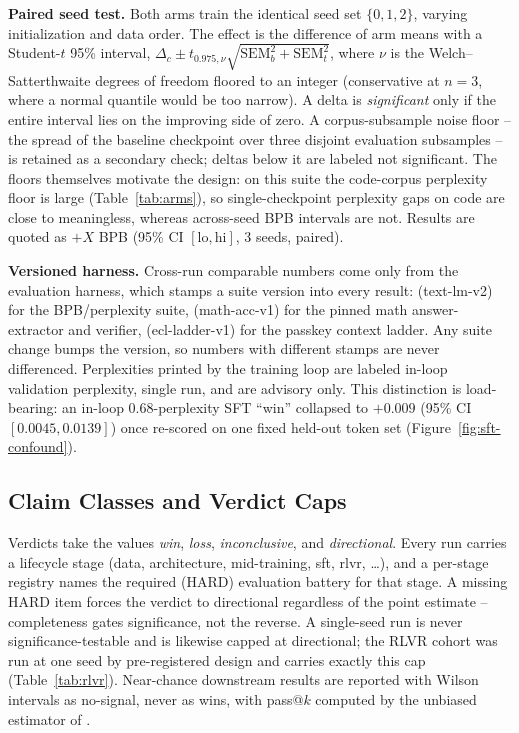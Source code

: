 \textbf{Paired seed test.} Both arms train the identical seed set
$\{0,1,2\}$, varying initialization and data order. The effect is the
difference of arm means with a Student-$t$ 95\% interval,
$\Delta_c \pm t_{0.975,\nu}\sqrt{\mathrm{SEM}_b^2+\mathrm{SEM}_t^2}$, where
$\nu$ is the Welch--Satterthwaite degrees of freedom floored to an integer
(conservative at $n{=}3$, where a normal quantile would be too narrow). A delta
is \emph{significant} only if the entire interval lies on the improving side of
zero. A corpus-subsample noise floor -- the spread of the baseline checkpoint
over three disjoint evaluation subsamples -- is retained as a secondary check;
deltas below it are labeled not significant. The floors themselves motivate the
design: on this suite the code-corpus perplexity floor is large
(Table~\ref{tab:arms}), so single-checkpoint perplexity gaps on code are close
to meaningless, whereas across-seed BPB intervals are not. Results are quoted
as $+X$ BPB (95\% CI $[\mathrm{lo},\mathrm{hi}]$, 3 seeds, paired).

\textbf{Versioned harness.} Cross-run comparable numbers come only from the
evaluation harness, which stamps a suite version into every result:
(text-lm-v2) for the BPB/perplexity suite, (math-acc-v1) for the pinned math
answer-extractor and verifier, (ecl-ladder-v1) for the passkey context ladder.
Any suite change bumps the version, so numbers with different stamps are never
differenced. Perplexities printed by the training loop are labeled in-loop
validation perplexity, single run, and are advisory only. This distinction is
load-bearing: an in-loop 0.68-perplexity SFT ``win'' collapsed to $+0.009$
(95\% CI $[0.0045, 0.0139]$) once re-scored on one fixed held-out token set
(Figure~\ref{fig:sft-confound}).

\subsection{Claim Classes and Verdict Caps}

Verdicts take the values \emph{win}, \emph{loss}, \emph{inconclusive}, and
\emph{directional}. Every run carries a lifecycle stage (data, architecture,
mid-training, sft, rlvr, \dots), and a per-stage registry names the required
(HARD) evaluation battery for that stage. A missing HARD item forces the
verdict to directional regardless of the point estimate -- completeness gates
significance, not the reverse. A single-seed run is never significance-testable
and is likewise capped at directional; the RLVR cohort was run at one seed by
pre-registered design and carries exactly this cap (Table~\ref{tab:rlvr}).
Near-chance downstream results are reported with Wilson intervals as no-signal,
never as wins, with pass@$k$ computed by the unbiased estimator of
\citet{chen2021evaluating}.

